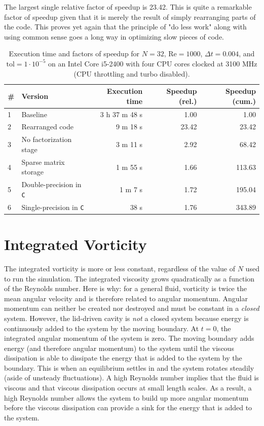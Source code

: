 The largest single relative factor of speedup is 23.42. This is quite a remarkable factor of speedup given that it is merely the result of simply rearranging parts of the code. This proves yet again that the principle of "do less work" along with using common sense goes a long way in optimizing slow pieces of code.

\begin{table}[h]
    \centering
    \begin{tabular}{llrrr}  
        \toprule
        \# & Version & Execution time & Speedup (rel.) & Speedup (cum.) \\
        \midrule
        1 & Baseline & 3 h 37 m 48 s & 1.00 & 1.00 \\
        2 & Rearranged code & 9 m 18 s & 23.42 & 23.42 \\
        3 & No factorization stage & 3 m 11 s & 2.92 & 68.42 \\
        4 & Sparse matrix storage & 1 m 55 s & 1.66 & 113.63 \\
        5 & Double-precision in \texttt{C} & 1 m 7 s & 1.72 & 195.04 \\
        6 & Single-precision in \texttt{C} & 38 s & 1.76 & 343.89 \\
        \bottomrule
    \end{tabular}
    \caption{Execution time and factors of speedup for $N = 32$, $\text{Re} = 1000$, $\Delta t = 0.004$, and $\text{tol} = 1 \cdot 10^{-5}$ on an Intel Core i5-2400 with four CPU cores clocked at 3100 MHz (CPU throttling and turbo disabled).}
    \label{tab:results1} 
\end{table}

\section{Integrated Vorticity}

The integrated vorticity is more or less constant, regardless of the value of $N$ used to run the simulation. The integrated viscosity grows quadratically as a function of the Reynolds number. Here is why: for a general fluid, vorticity is twice the mean angular velocity and is therefore related to angular momentum. Angular momentum can neither be created nor destroyed and must be constant in a \emph{closed} system. However, the lid-driven cavity is \emph{not} a closed system because energy is continuously added to the system by the moving boundary. At $t = 0$, the integrated angular momentum of the system is zero. The moving boundary adds energy (and therefore angular momentum) to the system until the viscous dissipation is able to dissipate the energy that is added to the system by the boundary. This is when an equilibrium settles in and the system rotates steadily (aside of unsteady fluctuations). A high Reynolds number implies that the fluid is viscous and that viscous dissipation occurs at small length scales. As a result, a high Reynolds number allows the system to build up more angular momentum before the viscous dissipation can provide a sink for the energy that is added to the system. 

